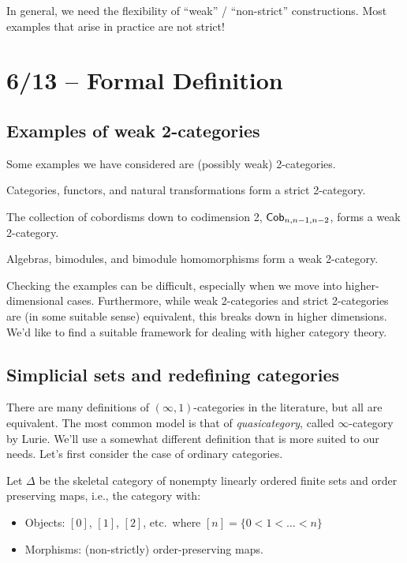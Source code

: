 In general, we need the flexibility of ``weak'' / ``non-strict'' constructions.
Most examples that arise in practice are not strict!

\section{6/13 -- Formal Definition}

\subsection{Examples of weak 2-categories}

Some examples we have considered are (possibly weak) 2-categories.

\begin{ex}
	Categories, functors, and natural transformations form a strict 2-category.
\end{ex}

\begin{ex}
	The collection of cobordisms down to codimension 2, $\mathsf{Cob}_{n,n-1,n-2}$, forms a weak 2-category.
\end{ex}

\begin{ex}
	Algebras, bimodules, and bimodule homomorphisms form a weak 2-category.
\end{ex}

Checking the examples can be difficult, especially when we move into higher-dimensional cases.
Furthermore, while weak 2-categories and strict 2-categories are (in some suitable sense) equivalent, this breaks down in higher dimensions.
We'd like to find a suitable framework for dealing with higher category theory.

\subsection{Simplicial sets and redefining categories}

There are many definitions of $(\infty, 1)$-categories in the literature, but all are equivalent.
The most common model is that of \emph{quasicategory}, called $\infty$-category by Lurie.
We'll use a somewhat different definition that is more suited to our needs.
Let's first consider the case of ordinary categories.

Let $\Delta$ be the skeletal category of nonempty linearly ordered finite sets and order preserving maps, i.e., the category with:
\begin{itemize}
	\item Objects: $[0]$, $[1]$, $[2]$, etc.\ where $[n] = \{ 0 < 1 < \dots < n \}$
	\item Morphisms: (non-strictly) order-preserving maps.
\end{itemize}

